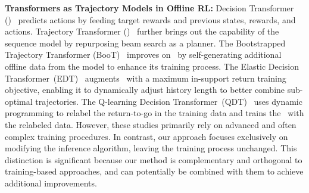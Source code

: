 \textbf{Transformers as Trajectory Models in Offline RL:}
Decision Transformer (\dt)~\cite{r:4} predicts actions by feeding target rewards and previous states, rewards, and actions. 
Trajectory Transformer (\trt)~\cite{r:3} further brings out the capability of the sequence model by repurposing beam search as a planner. 
The Bootstrapped Trajectory Transformer (BooT)~\cite{r:134} improves on~\trt{} by self-generating additional offline data from the model to enhance its training process. The Elastic Decision Transformer~(EDT)~\cite{r:133} augments~\dt{} with a maximum in-support return training objective, enabling it to dynamically adjust history length to better combine sub-optimal trajectories. The Q-learning Decision Transformer~(QDT)~\cite{r:135} uses dynamic programming to relabel the return-to-go in the training data and trains the~\dt{} with the relabeled data. 
However, these studies primarily rely on advanced and often complex training procedures. 
In contrast, our approach focuses exclusively on modifying the inference algorithm, leaving the training process unchanged. This distinction is significant because our method is complementary and orthogonal to training-based approaches, and can potentially be combined with them to achieve additional improvements.





